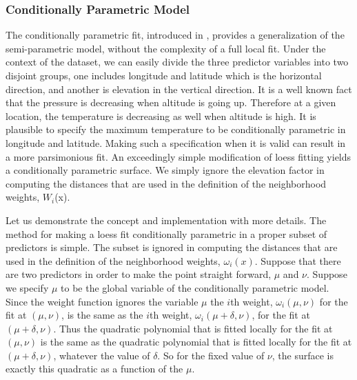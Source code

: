 \subsubsection{Conditionally Parametric Model}

The conditionally parametric fit, introduced in \cite{cleveland1992local}, provides
a generalization of the semi-parametric model, without the complexity of a full
local fit. Under the context of the dataset, we can easily divide the three 
predictor variables into two disjoint groups, one includes longitude and latitude
which is the horizontal direction, and another is elevation in the vertical 
direction. It is a well known fact that the pressure is decreasing when altitude
is going up. Therefore at a given location, the temperature is decreasing as well
when altitude is high. It is plausible to specify the maximum temperature to be
conditionally parametric in longitude and latitude.
Making such a specification when it is valid can result in a more parsimonious fit.
An exceedingly simple modification of loess fitting yields a conditionally
parametric surface. We simply ignore the elevation factor in computing the 
distances that are used in the definition of the neighborhood weights, $W_i$(x).

Let us demonstrate the concept and implementation with more details. The method 
for making a loess fit conditionally parametric in a proper subset of predictors 
is simple. The subset is ignored in computing the distances that are used in the 
definition of the neighborhood weights, $\omega_i(x)$.
Suppose that there are two predictors in order to make the point straight forward, 
$\mu$ and $\nu$. Suppose we specify $\mu$ to be the global variable of the 
conditionally parametric model. Since the weight function ignores the variable 
$\mu$ the $i$th weight, 
$\omega_i(\mu, \nu)$ for the fit at $(\mu, \nu)$, is the same as the $i$th weight, 
$\omega_i(\mu+\delta, \nu)$, for the fit at $(\mu+\delta, \nu)$. Thus the quadratic 
polynomial that is fitted locally for the fit at $(\mu, \nu)$ is the same as the 
quadratic polynomial that is fitted locally for the fit at $(\mu+\delta, \nu)$, 
whatever the value of $\delta$. So for the fixed 
value of $\nu$, the surface is exactly this quadratic as a function of the $\mu$.

